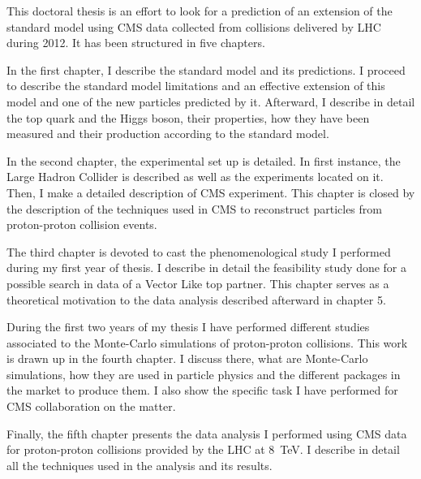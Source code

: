 This doctoral thesis is an effort to look for a prediction of an extension of the standard model using CMS data collected from collisions delivered by LHC during 2012. It has been structured in five chapters.

In the first chapter, I describe the standard model and its predictions. I proceed to describe the standard model limitations and an effective extension of this model and one of the new particles predicted by it. Afterward, I describe in detail the top quark and the Higgs boson, their properties, how they have been measured and their production according to the standard model.

In the second chapter, the experimental set up is detailed. In first instance, the Large Hadron Collider is described as well as the experiments located on it. Then, I make a detailed description of CMS experiment. This chapter is closed by the description of the techniques used in CMS to reconstruct particles from proton-proton collision events. 

The third chapter is devoted to cast the phenomenological study I performed during my first year of thesis. I describe in detail the feasibility study done for a possible search in data of a Vector Like top partner. This chapter serves as a theoretical motivation to the data analysis described afterward in chapter 5.

During the first two years of my thesis I have performed different studies associated to the Monte-Carlo simulations of proton-proton collisions. This work is drawn up in the fourth chapter. I discuss there, what are Monte-Carlo simulations, how they are used in particle physics and the different packages in the market to produce them. I also show the specific task I have performed for CMS collaboration on the matter.

Finally, the fifth chapter presents the data analysis I performed using CMS data for proton-proton collisions provided by the LHC at 8~TeV. I describe in detail all the techniques used in the analysis and its results.